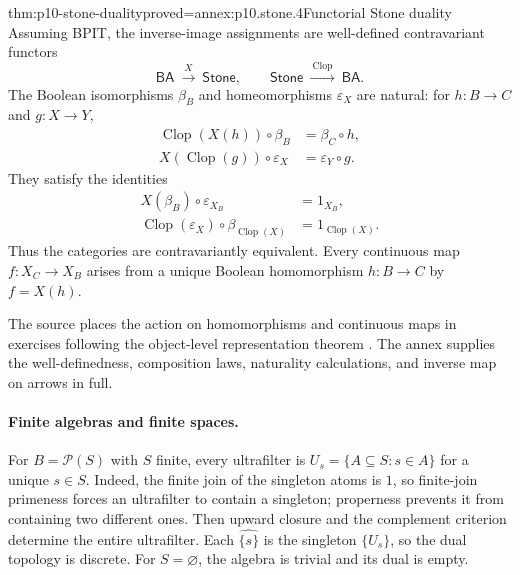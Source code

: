 \begin{hbtheorem}{thm:p10-stone-duality}{proved=annex:p10.stone.4}{Functorial Stone duality}
Assuming BPIT, the inverse-image assignments are well-defined
contravariant functors
\[
 \mathsf{BA}\ \xrightarrow{\ X\ }\ \mathsf{Stone},
 \qquad
 \mathsf{Stone}\ \xrightarrow{\ \operatorname{Clop}\ }\ \mathsf{BA}.
\]
The Boolean isomorphisms \(\beta_B\) and homeomorphisms
\(\varepsilon_X\) are natural: for \(h:B\to C\) and \(g:X\to Y\),
\[
\begin{aligned}
 \operatorname{Clop}(X(h))\circ\beta_B&=\beta_C\circ h,\\
 X(\operatorname{Clop}(g))\circ\varepsilon_X&=\varepsilon_Y\circ g.
\end{aligned}
\]
They satisfy the identities
\[
\begin{aligned}
 X(\beta_B)\circ\varepsilon_{X_B}&=1_{X_B},\\
 \operatorname{Clop}(\varepsilon_X)\circ
                 \beta_{\operatorname{Clop}(X)}
      &=1_{\operatorname{Clop}(X)}.
\end{aligned}
\]
Thus the categories are contravariantly equivalent.
Every continuous map \(f:X_C\to X_B\) arises from a unique Boolean
homomorphism \(h:B\to C\) by \(f=X(h)\).
\end{hbtheorem}

The source places the action on homomorphisms and continuous maps
in exercises following the object-level representation theorem
\cite[IV\S4, Exercises~9--10, p.~140]{BurrisSankappanavar2012}.
The annex supplies the well-definedness, composition laws,
naturality calculations, and inverse map on arrows in full.

\paragraph{Finite algebras and finite spaces.}
For \(B=\mathcal P(S)\) with \(S\) finite, every ultrafilter is
\(U_s=\{A\subseteq S:s\in A\}\) for a unique \(s\in S\).
Indeed, the finite join of the singleton atoms is \(1\), so finite-join
primeness forces an ultrafilter to contain a singleton; properness
prevents it from containing two different ones.
Then upward closure and the complement criterion determine the entire
ultrafilter. Each \(\widehat{\{s\}}\) is the singleton \(\{U_s\}\),
so the dual topology is discrete.
For \(S=\varnothing\), the algebra is trivial and its dual is empty.
